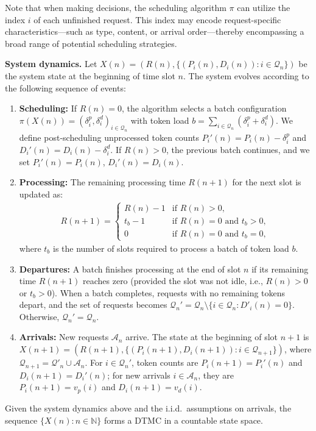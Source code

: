 \documentclass[11pt]{article}
\theoremstyle{plain}
\theoremstyle{definition}
\theoremstyle{remark}
\newcommand{\N}{\mathbb{N}}
\begin{document}
Note that when making decisions, the scheduling algorithm $\pi$ can utilize the index $i$ of each unfinished request. This index may encode request-specific characteristics—such as type, content, or arrival order—thereby encompassing a broad range of potential scheduling strategies. 

\textbf{System dynamics.} Let $X(n)=(R(n), \{(P_i(n), D_i(n)) : i\in \mathcal{Q}_n\})$ be the system state at the beginning of time slot $n$. The system evolves according to the following sequence of events:
\begin{enumerate}
\item \textbf{Scheduling:} If $R(n) = 0$, the algorithm selects a batch configuration $\pi(X(n)) = (\delta_i^p, \delta_i^d)_{i \in \mathcal{Q}_n}$ with token load $b = \sum_{i \in \mathcal{Q}_n}(\delta_i^{p} + \delta_i^{d})$.  We define post-scheduling unprocessed token counts $P_{i}'(n) = P_{i}(n) - \delta_{i}^{p}$ and $D_{i}'(n) = D_{i}(n) - \delta_{i}^{d}$. If $R(n) > 0$, the previous batch continues, and we set $P_i'(n) = P_i(n)$, $D_i'(n) = D_i(n)$.

\item \textbf{Processing:} The remaining processing time $R(n+1)$ for the next slot is updated as:
\begin{align}
    \label{eq:r-transition}
    R(n+1) = \begin{cases}
        R(n) - 1  & \text{if } R(n) > 0, \\
        t_{b} - 1 & \text{if } R(n) = 0 \text{ and } t_{b} > 0, \\ 
        0         & \text{if } R(n) = 0 \text{ and } t_{b} = 0,
    \end{cases}
\end{align}
where $t_b$ is the number of slots required to process a batch of token load $b$.

\item \textbf{Departures:} A batch finishes processing at the end of slot $n$ if its remaining time $R(n+1)$ reaches zero (provided the slot was not idle, i.e., $R(n) > 0$ or $t_b > 0$). When a batch completes, requests with no remaining tokens depart, and the set of requests becomes $\mathcal{Q}_{n}' = \mathcal{Q}_n \setminus \{i\in \mathcal{Q}_n: D'_i(n)=0\}$. Otherwise, $\mathcal{Q}_n' = \mathcal{Q}_n$.

\item \textbf{Arrivals:} New requests $\mathcal{A}_n$ arrive. The state at the beginning of slot $n+1$ is $X(n+1)=(R(n+1), \{(P_i(n+1), D_i(n+1)) : i\in \mathcal{Q}_{n+1}\})$, where $\mathcal{Q}_{n+1} = \mathcal{Q}'_n \cup \mathcal{A}_n$. For $i\in \mathcal{Q}_n'$, token counts are $P_i(n+1) = P_i'(n)$ and $D_i(n+1) = D_i'(n)$; for new arrivals $i\in \mathcal{A}_n$, they are $P_i(n+1) = v_p(i)$ and $D_i(n+1) = v_d(i)$.
\end{enumerate}
Given the system dynamics above and the i.i.d.\ assumptions on arrivals, the sequence $\{X(n) : n\in \N\}$ forms a  DTMC in a countable state space.
\end{document}

